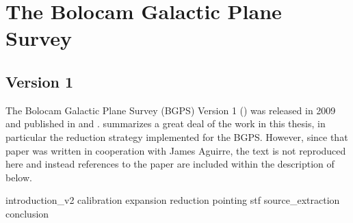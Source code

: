 
\chapter{The Bolocam Galactic Plane Survey}


\section{Version 1}
The Bolocam Galactic Plane Survey (BGPS) Version 1 (\vone) was released in 2009 and published in
\citet{Aguirre2011} and \citet{Rosolowsky2010}.  \citet{Aguirre2011} summarizes 
a great deal of the work in this thesis, in particular the reduction strategy
implemented for the BGPS.  However, since that paper was written in cooperation
with James Aguirre, the text is not reproduced here and instead references to
the paper are included within the description of \vtwo below.

{introduction_v2}
{calibration} %
{expansion}
{reduction} %
{pointing} %
{stf} %
{source_extraction} %
{conclusion}



